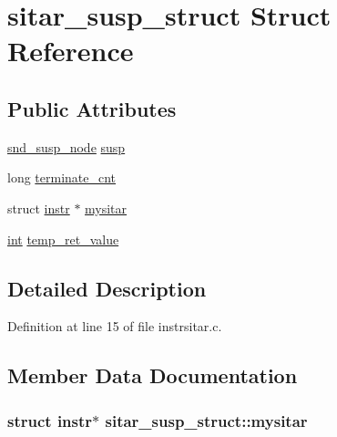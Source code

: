 \hypertarget{structsitar__susp__struct}{}\section{sitar\+\_\+susp\+\_\+struct Struct Reference}
\label{structsitar__susp__struct}
\subsection*{Public Attributes}
\begin{DoxyCompactItemize}
\item 
\hyperlink{sound_8h_a6b268203688a934bd798ceb55f85d4c0}{snd\+\_\+susp\+\_\+node} \hyperlink{structsitar__susp__struct_aaf113890088bfba50132f3533e7cc3bb}{susp}
\item 
long \hyperlink{structsitar__susp__struct_a5b808bff604088cef5107144b06bc303}{terminate\+\_\+cnt}
\item 
struct \hyperlink{structinstr}{instr} $\ast$ \hyperlink{structsitar__susp__struct_a4b17d1b50de020fe8367b283ad05569e}{mysitar}
\item 
\hyperlink{xmltok_8h_a5a0d4a5641ce434f1d23533f2b2e6653}{int} \hyperlink{structsitar__susp__struct_a4109a5071cf2141133fb3be2043a68d6}{temp\+\_\+ret\+\_\+value}
\end{DoxyCompactItemize}


\subsection{Detailed Description}


Definition at line 15 of file instrsitar.\+c.



\subsection{Member Data Documentation}
\subsubsection[{\texorpdfstring{mysitar}{mysitar}}]{\setlength{\rightskip}{0pt plus 5cm}struct {\bf instr}$\ast$ sitar\+\_\+susp\+\_\+struct\+::mysitar}\hypertarget{structsitar__susp__struct_a4b17d1b50de020fe8367b283ad05569e}{}\label{structsitar__susp__struct_a4b17d1b50de020fe8367b283ad05569e}


